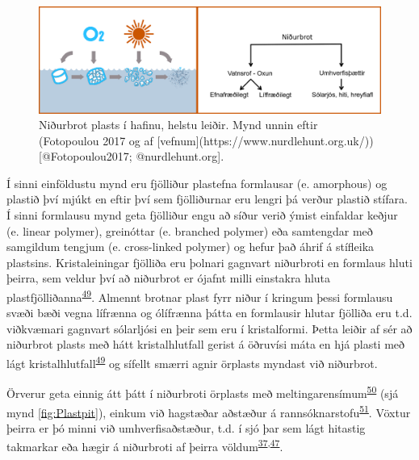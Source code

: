 \documentclass[icelandic,]{book}
\begin{document}
\begin{figure}

{\centering \includegraphics[width=1\linewidth]{myndir/small-plastics_FLAEDIRIT} 

}

\caption{Niðurbrot plasts í hafinu, helstu leiðir. Mynd unnin eftir (Fotopoulou 2017 og af [vefnum](https://www.nurdlehunt.org.uk/)) [@Fotopoulou2017; @nurdlehunt.org].}\label{fig:flowchart}
\end{figure}

Í sinni einföldustu mynd eru fjölliður plastefna formlausar (e. amorphous) og plastið því mjúkt en eftir því sem fjölliðurnar eru lengri þá verður plastið stífara. Í sinni formlausu mynd geta fjölliður engu að síður verið ýmist einfaldar keðjur (e. linear polymer), greinóttar (e. branched polymer) eða samtengdar með samgildum tengjum (e. cross-linked polymer) og hefur það áhrif á stífleika plastsins. Kristaleiningar fjölliða eru þolnari gagnvart niðurbroti en formlaus hluti þeirra, sem veldur því að niðurbrot er ójafnt milli einstakra hluta plastfjölliðanna\textsuperscript{\protect\hyperlink{ref-andrady2017plastic}{49}}. Almennt brotnar plast fyrr niður í kringum þessi formlausu svæði bæði vegna lífrænna og ólífrænna þátta en formlausir hlutar fjölliða eru t.d. viðkvæmari gagnvart sólarljósi en þeir sem eru í kristalformi. Þetta leiðir af sér að niðurbrot plasts með hátt kristalhlutfall gerist á öðruvísi máta en hjá plasti með lágt kristalhlutfall\textsuperscript{\protect\hyperlink{ref-andrady2017plastic}{49}} og sífellt smærri agnir örplasts myndast við niðurbrot.

Örverur geta einnig átt þátt í niðurbroti örplasts með meltingarensímum\textsuperscript{\protect\hyperlink{ref-shah2008biological}{50}} (sjá mynd \ref{fig:Plastpit}), einkum við hagstæðar aðstæður á rannsóknarstofu\textsuperscript{\protect\hyperlink{ref-pacco2017biodegradation}{51}}. Vöxtur þeirra er þó minni við umhverfisaðstæður, t.d. í sjó þar sem lágt hitastig takmarkar eða hægir á niðurbroti af þeirra völdum\textsuperscript{\protect\hyperlink{ref-andrady2011microplastics}{37},\protect\hyperlink{ref-barnes2009accumulation}{47}}.
\end{document}
